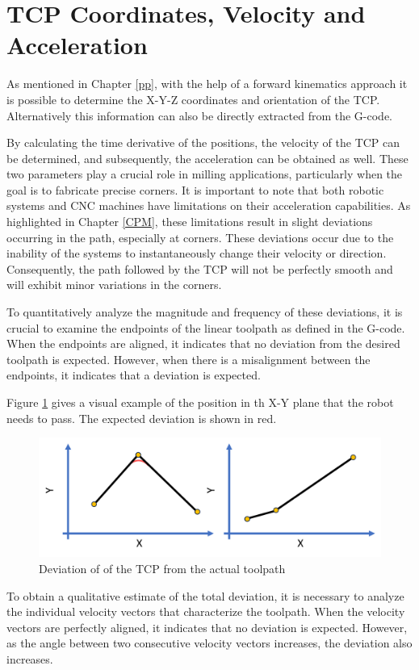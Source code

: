 \section{TCP Coordinates, Velocity and Acceleration}
As mentioned in Chapter \ref{pp}, with the help of a forward kinematics approach it is possible to determine the X-Y-Z coordinates and orientation of the TCP. Alternatively this information can also be directly extracted from the G-code.

By calculating the time derivative of the positions, the velocity of the TCP can be determined, and subsequently, the acceleration can be obtained as well. These two parameters play a crucial role in milling applications, particularly when the goal is to fabricate precise corners. It is important to note that both robotic systems and CNC machines have limitations on their acceleration capabilities. As highlighted in Chapter \ref{CPM}, these limitations result in slight deviations occurring in the path, especially at corners. These deviations occur due to the inability of the systems to instantaneously change their velocity or direction. Consequently, the path followed by the TCP will not be perfectly smooth and will exhibit minor variations in the corners.


To quantitatively analyze the magnitude and frequency of these deviations, it is crucial to examine the endpoints of the linear toolpath as defined in the G-code. When the endpoints are aligned, it indicates that no deviation from the desired toolpath is expected. However, when there is a misalignment between the endpoints, it indicates that a deviation is expected.

Figure \ref{devi} gives a visual example of the position in th X-Y plane that the robot needs to pass. The expected deviation is shown in red.

\begin{figure}[H]
	\centerline{\includegraphics[width=.651\textwidth]{figures/uber.png}}
	\caption{Deviation of of the TCP from the actual toolpath}
	\label{devi}
\end{figure}

To obtain a qualitative estimate of the total deviation, it is necessary to analyze the individual velocity vectors that characterize the toolpath. When the velocity vectors are perfectly aligned, it indicates that no deviation is expected. However, as the angle between two consecutive velocity vectors increases, the deviation also increases.

